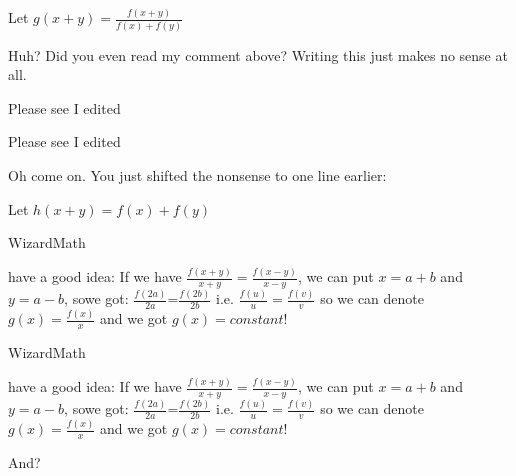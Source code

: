 \begin{solution}
	\begin{tcolorbox}
Let $g(x+y)=\frac{f(x+y)}{f(x)+f(y)}$ \end{tcolorbox}
Huh? Did you even read my comment above? Writing this just makes no sense at all.

\end{solution}



\begin{solution}
	Please see I edited
\end{solution}






\begin{solution}
	\begin{tcolorbox}Please see I edited\end{tcolorbox}
Oh come on. You just shifted the nonsense to one line earlier:
\begin{tcolorbox}Let $h(x+y)=f(x)+f(y)$\end{tcolorbox}



\end{solution}



\begin{solution}
	\begin{bolded}WizardMath\end{bolded} have a good idea: If we have $\frac{f(x+y)}{x+y} = \frac{f(x-y)}{x-y}$, we can put $x=a+b$ and $y=a-b$, sowe got: $\frac{f(2a)}{2a}$=$\frac{f(2b)}{2b}$ i.e. $\frac{f(u)}{u}=\frac{f(v)}{v}$ so we can denote $g(x)=\frac{f(x)}{x}$ and we got $g(x)=constant!$

\end{solution}



\begin{solution}
	\begin{tcolorbox}\begin{bolded}WizardMath\end{bolded} have a good idea: If we have $\frac{f(x+y)}{x+y} = \frac{f(x-y)}{x-y}$, we can put $x=a+b$ and $y=a-b$, sowe got: $\frac{f(2a)}{2a}$=$\frac{f(2b)}{2b}$ i.e. $\frac{f(u)}{u}=\frac{f(v)}{v}$ so we can denote $g(x)=\frac{f(x)}{x}$ and we got $g(x)=constant!$\end{tcolorbox}

And?

\end{solution}



